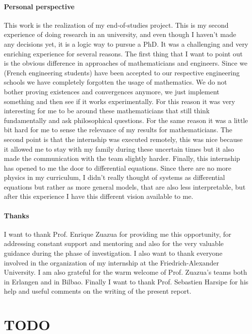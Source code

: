 \documentclass[12pt, letterpaper]{article}
\begin{document}
\begin{itemize}
\paragraph{Personal perspective} This work is the realization of my end-of-studies project. 
This is my second experience of doing research in an university, and even though I haven’t made any decisions yet, it is a logic way to pursue a PhD. 
It was a challenging and very enriching experience for several reasons. 
The first thing that I want to point out is the obvious difference in approaches of mathematicians and engineers. Since we (French engineering students) have been accepted to our respective engineering schools we have completely forgotten the usage of mathematics. 
We do not bother proving existences and convergences anymore, we just implement something and then see if it works experimentally. 
For this reason it was very interesting for me to be around these mathematicians that still think fundamentally and ask philosophical questions. 
For the same reason it was a little bit hard for me to sense the relevance of my results for mathematicians.
The second point is that the internship was executed remotely, this was nice because it allowed me to stay with my family during these uncertain times but it also made the communication with the team slightly harder.
Finally, this internship has opened to me the door to differential equations. 
Since there are no more physics in my curriculum, I didn't really thought of systems as differential equations but rather as more general models, that are also less interpretable, but after this experience I have this different vision available to me.


\paragraph{Thanks} I want to thank Prof. Enrique Zuazua for providing me this opportunity, for addressing constant support and mentoring and also for the very valuable guidance during the phase of investigation. 
I also want to thank everyone involved in the organization of my internship at the Friedrich-Alexander University. 
I am also grateful for the warm welcome of Prof. Zuazua's teams both in Erlangen and in Bilbao. 
Finally I want to thank Prof. Sebastien Harsipe for his help and useful comments on the writing of the present report.

\section*{TODO}


\end{itemize}
\end{document}
